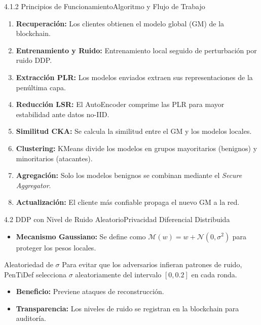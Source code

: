 \begin{frame}{4.1.2 Principios de Funcionamiento}{Algoritmo y Flujo de Trabajo}
    \begin{enumerate}
        \item \textbf{Recuperación:} Los clientes obtienen el modelo global (GM) de la blockchain.
        \item \textbf{Entrenamiento y Ruido:} Entrenamiento local seguido de perturbación por ruido DDP.
        \item \textbf{Extracción PLR:} Los modelos enviados extraen sus representaciones de la penúltima capa.
        \item \textbf{Reducción LSR:} El AutoEncoder comprime las PLR para mayor estabilidad ante datos no-IID.
        \item \textbf{Similitud CKA:} Se calcula la similitud entre el GM y los modelos locales.
        \item \textbf{Clustering:} KMeans divide los modelos en grupos mayoritarios (benignos) y minoritarios (atacantes).
        \item \textbf{Agregación:} Solo los modelos benignos se combinan mediante el \textit{Secure Aggregator}.
        \item \textbf{Actualización:} El cliente más confiable propaga el nuevo GM a la red.
    \end{enumerate}
\end{frame}

\begin{frame}{4.2 DDP con Nivel de Ruido Aleatorio}{Privacidad Diferencial Distribuida}
    \begin{itemize}
        \item \textbf{Mecanismo Gaussiano:} Se define como $\mathcal{M}(w) = w + \mathcal{N}(0, \sigma^2)$ para proteger los pesos locales.
    \end{itemize}
    \begin{exampleblock}{Aleatoriedad de $\sigma$}
        Para evitar que los adversarios infieran patrones de ruido, PenTiDef selecciona $\sigma$ aleatoriamente del intervalo $[0, 0.2]$ en cada ronda.
    \end{exampleblock}
    \begin{itemize}
        \item \textbf{Beneficio:} Previene ataques de reconstrucción.
        \item \textbf{Transparencia:} Los niveles de ruido se registran en la blockchain para auditoría.
    \end{itemize}
\end{frame}

